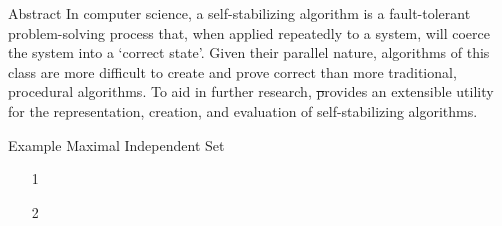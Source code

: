 \documentclass{beamer}
\begin{document}
\begin{frame}[fragile,t]
  \maketitle
  \vspace{1in}
  \begin{columns}[t]
    \begin{column}{.45\textwidth}
      \begin{block}{Abstract}
        In computer science,
            a self-stabilizing algorithm is
            a fault-tolerant problem-solving process that,
            when applied repeatedly to a system,
            will coerce the system into a ‘correct state’.
        Given their parallel nature,
            algorithms of this class are more difficult
            to create and prove correct than
            more traditional, procedural algorithms.
        To aid in further research,
            \st provides an extensible utility for
            the representation, creation, and evaluation
            of self-stabilizing algorithms.
      \end{block}

      \begin{block}{Example \Dash Maximal Independent Set}
        \begin{minipage}[b]{4in}
          \begin{enumerate}
          \item[1]
          \item[2]
\end{enumerate}
\end{minipage}
\end{block}
\end{column}
\end{columns}
\end{frame}
\end{document}
